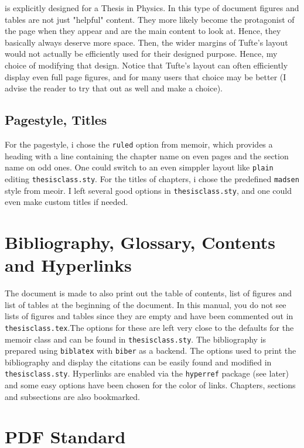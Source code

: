 is explicitly designed for a Thesis in Physics. In this type of document figures and tables are not just "helpful" content. They more likely become the protagonist of the page when they appear and are the main content to look at. Hence, they basically always deserve more space. Then, the wider margins of Tufte's layout would not actually be efficiently used for their designed purpose. Hence, my choice of modifying that design. Notice that Tufte's layout can often efficiently display even full page figures, and for many users that choice may be better (I advise the reader to try that out as well and make a choice). 

\subsection{Pagestyle, Titles}

For the pagestyle, i chose the \texttt{ruled} option from memoir, which provides a heading with a line containing the chapter name on even pages and the section name on odd ones. One could switch to an even simppler layout like \texttt{plain} editing \texttt{thesisclass.sty}. For the titles of chapters, i chose the predefined \texttt{madsen} style from meoir. I left several good options in \texttt{thesisclass.sty}, and one could even make custom titles if needed.

\section{Bibliography, Glossary, Contents and Hyperlinks}

The document is made to also print out the table of contents, list of figures and list of tables at the beginning of the document. In this manual, you do not see lists of figures and tables since they are empty and have been commented out in \texttt{thesisclass.tex}.The options for these are left very close to the defaults for the memoir class and can be found in \texttt{thesisclass.sty}. The bibliography is prepared using \texttt{biblatex} with \texttt{biber} as a backend. The options used to print the bibliography and display the citations can be easily found and modified in \texttt{thesisclass.sty}. Hyperlinks are enabled via the \texttt{hyperref} package (see later) and some easy options have been chosen for the color of links. Chapters, sections and subsections are also bookmarked. 

\section{PDF Standard}

